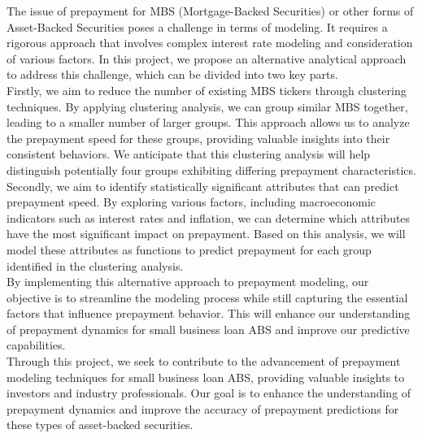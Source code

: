 \begin{enumerate}


The issue of prepayment for MBS (Mortgage-Backed Securities) or other forms of Asset-Backed Securities poses a challenge in terms of modeling. It requires a rigorous approach that involves complex interest rate modeling and consideration of various factors. In this project, we propose an alternative analytical approach to address this challenge, which can be divided into two key parts.\\

Firstly, we aim to reduce the number of existing MBS tickers through clustering techniques. By applying clustering analysis, we can group similar MBS together, leading to a smaller number of larger groups. This approach allows us to analyze the prepayment speed for these groups, providing valuable insights into their consistent behaviors. We anticipate that this clustering analysis will help distinguish potentially four groups exhibiting differing prepayment characteristics.\\

Secondly, we aim to identify statistically significant attributes that can predict prepayment speed. By exploring various factors, including macroeconomic indicators such as interest rates and inflation, we can determine which attributes have the most significant impact on prepayment. Based on this analysis, we will model these attributes as functions to predict prepayment for each group identified in the clustering analysis.\\

By implementing this alternative approach to prepayment modeling, our objective is to streamline the modeling process while still capturing the essential factors that influence prepayment behavior. This will enhance our understanding of prepayment dynamics for small business loan ABS and improve our predictive capabilities.\\

Through this project, we seek to contribute to the advancement of prepayment modeling techniques for small business loan ABS, providing valuable insights to investors and industry professionals. Our goal is to enhance the understanding of prepayment dynamics and improve the accuracy of prepayment predictions for these types of asset-backed securities.\\


\end{enumerate}